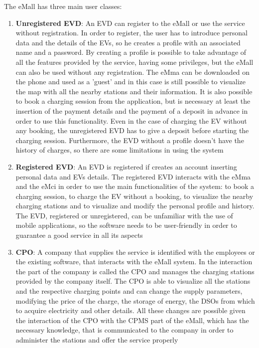 The eMall has three main user classes:
\begin{enumerate}
    \item \textbf{Unregistered EVD}: An EVD can register to the eMall or use the service without registration. In order to register, the user has to introduce personal data and the details of the EVs, so he creates a profile with an associated name and a password. By creating a profile is possible to take advantage of all the features provided by the service, having some privileges, but the eMall can also be used without any registration. The eMma can be downloaded on the phone and used as a 'guest' and in this case is still possible to visualize the map with all the nearby stations and their information. It is also possible to book a charging session from the application, but is necessary at least the insertion of the payment details and the payment of a deposit in advance in order to use this functionality. Even in the case of charging the EV without any booking, the unregistered EVD has to give a deposit before starting the charging session. Furthermore, the EVD without a profile doesn't have the history of charges, so there are some limitations in using the system
    \item \textbf{Registered EVD}: An EVD is registered if creates an account inserting personal data and EVs details. The registered EVD interacts with the eMma and the eMci in order to use the main functionalities of the system: to book a charging session, to charge the EV without a booking, to visualize the nearby charging stations and to visualize and modify the personal profile and history. The EVD, registered or unregistered, can be unfamiliar with the use of mobile applications, so the software needs to be user-friendly in order to guarantee a good service in all its aspects 
    \item \textbf{CPO}: A company that supplies the service is identified with the employees or the existing software, that interacts with the eMall system. In the interaction the part of the company is called the CPO and manages the charging stations provided by the company itself. The CPO is able to visualize all the stations and the respective charging points and can change the supply parameters, modifying the price of the charge, the storage of energy, the DSOs from which to acquire electricity and other details. All these changes are possible given the interaction of the CPO with the CPMS part of the eMall, which has the necessary knowledge, that is communicated to the company in order to administer the stations and offer the service properly 
\end{enumerate}